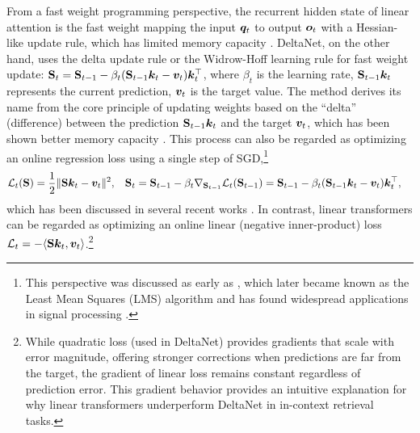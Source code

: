 From a fast weight programming \cite{schmidhuber_learning_1992} 
 perspective, the recurrent hidden state of linear  attention is the fast weight mapping the input ${\bm{q}}_t$ to output ${\bm{o}}_t$ with a Hessian-like update rule, which has limited memory capacity \cite{McEliece1987TheCO}. DeltaNet, on the other hand, uses the delta update rule or the Widrow-Hoff learning rule \cite{widrow_adaptive_1988} for fast weight update: ${\mathbf{S}}_t = {\mathbf{S}}_{t-1} - \beta_t ({\mathbf{S}}_{t-1}{\bm{k}}_t - {\bm{v}}_t) {\bm{k}}_t^\top$, where $\beta_t$ is the learning rate, ${\mathbf{S}}_{t-1}{\bm{k}}_t$ represents the current prediction, ${\bm{v}}_t$ is the target value. The method derives its name from the core principle of updating weights based on the ``delta'' (difference) between the prediction ${\mathbf{S}}_{t-1}{\bm{k}}_t$ and the target ${\bm{v}}_t$, which has been shown better memory capacity  \cite{Gardner1988TheSO,Prados1989NeuralNC,Lingashetty2010DeltaLR,schlag_linear_2021}. This process can also be regarded as optimizing an online regression loss  using a single step of SGD,\footnote{This perspective was discussed as early as \citet{widrow_adaptive_1988}, which later became known as the Least Mean Squares (LMS) algorithm and has found widespread applications in signal processing \citep{Rogers1996AdaptiveFT}.
} 
\vspace{-2mm}
 \begin{align*}
     \mathcal{L}_t({\mathbf{S}}) &= \frac{1}{2}\|{\mathbf{S}} {\bm{k}}_t - {\bm{v}}_t\|^2, && {\mathbf{S}}_t = {\mathbf{S}}_{t-1} - \beta_t \nabla_{{\mathbf{S}}_{t-1}} \mathcal{L}_t({\mathbf{S}}_{t-1}) =  {\mathbf{S}}_{t-1} - \beta_t ({\mathbf{S}}_{t-1}{\bm{k}}_t - {\bm{v}}_t) {\bm{k}}_t^\top,
 \end{align*}
 \vspace{-2mm}
which has been discussed in several recent works \cite{sun-2024-learning,liu-2024-longhorn,yang2024gateddeltanetworksimproving,behrouz2024titanslearningmemorizetest}. In contrast, linear transformers can be regarded as optimizing an online linear (negative inner-product) loss $\mathcal{L}_{t}=-\langle{\mathbf{S}}{\bm{k}}_t, {\bm{v}}_t\rangle$.\footnote{While quadratic loss (used in DeltaNet) provides gradients that scale with error magnitude, offering stronger corrections when predictions are far from the target, the gradient of linear loss remains constant regardless of prediction error. This gradient behavior provides an intuitive explanation for why linear transformers underperform DeltaNet in in-context retrieval tasks.} 


